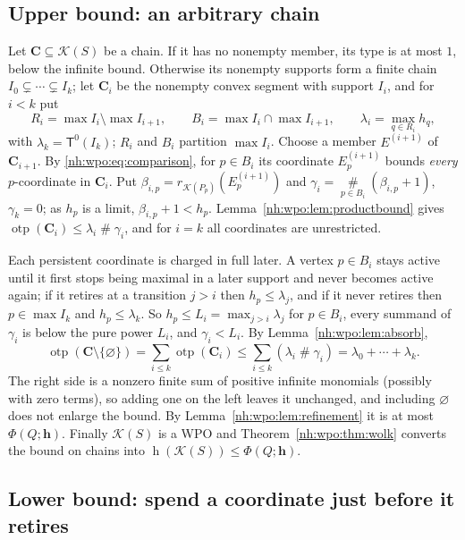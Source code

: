 \documentclass[11pt,a4paper]{article}
\theoremstyle{definition}
\theoremstyle{remark}
\newcommand{\K}{\mathcal K}
\newcommand{\hgt}{\operatorname{h}}
\newcommand{\ns}{\mathbin{\#}}
\newcommand{\bigns}{\mathop{\#}\limits}
\newcommand{\otp}{\operatorname{otp}}
\newcommand{\Tz}{\mathsf T^{0}}
\begin{document}
\subsection{Upper bound: an arbitrary chain}

Let $\mathbf C\subseteq\K(S)$ be a chain. If it has no nonempty member, its type
is at most $1$, below the infinite bound. Otherwise its nonempty supports form a
finite chain $I_0\subsetneq\cdots\subsetneq I_k$; let $\mathbf C_i$ be the
nonempty convex segment with support $I_i$, and for $i<k$ put
\[
 R_i=\max I_i\setminus\max I_{i+1},\qquad B_i=\max I_i\cap\max I_{i+1},\qquad
 \lambda_i=\max_{q\in R_i}h_q,
\]
with $\lambda_k=\Tz(I_k)$; $R_i$ and $B_i$ partition $\max I_i$. Choose a member
$E^{(i+1)}$ of $\mathbf C_{i+1}$. By \eqref{nh:wpo:eq:comparison}, for $p\in B_i$
its coordinate $E^{(i+1)}_p$ bounds \emph{every} $p$-coordinate in $\mathbf C_i$.
Put $\beta_{i,p}=r_{\K(P_p)}(E^{(i+1)}_p)$ and
$\gamma_i=\bigns_{p\in B_i}(\beta_{i,p}+1)$, $\gamma_k=0$; as $h_p$ is a limit,
$\beta_{i,p}+1<h_p$. Lemma~\ref{nh:wpo:lem:productbound} gives
$\otp(\mathbf C_i)\le\lambda_i\ns\gamma_i$, and for $i=k$ all coordinates are
unrestricted.

Each persistent coordinate is charged in full later. A vertex $p\in B_i$ stays
active until it first stops being maximal in a later support and never becomes
active again; if it retires at a transition $j>i$ then $h_p\le\lambda_j$, and if
it never retires then $p\in\max I_k$ and $h_p\le\lambda_k$. So
$h_p\le L_i=\max_{j>i}\lambda_j$ for $p\in B_i$, every summand of $\gamma_i$ is
below the pure power $L_i$, and $\gamma_i<L_i$. By
Lemma~\ref{nh:wpo:lem:absorb},
\begin{equation}\label{nh:wpo:eq:chainupper}
 \otp(\mathbf C\setminus\{\varnothing\})=\sum_{i\le k}\otp(\mathbf C_i)
 \le\sum_{i\le k}(\lambda_i\ns\gamma_i)=\lambda_0+\cdots+\lambda_k .
\end{equation}
The right side is a nonzero finite sum of positive infinite monomials (possibly
with zero terms), so adding one on the left leaves it unchanged, and including
$\varnothing$ does not enlarge the bound. By Lemma~\ref{nh:wpo:lem:refinement} it
is at most $\Phi(Q;\boldsymbol h)$. Finally $\K(S)$ is a WPO and
Theorem~\ref{nh:wpo:thm:wolk} converts the bound on chains into
$\hgt(\K(S))\le\Phi(Q;\boldsymbol h)$.

\subsection{Lower bound: spend a coordinate just before it retires}
\end{document}

